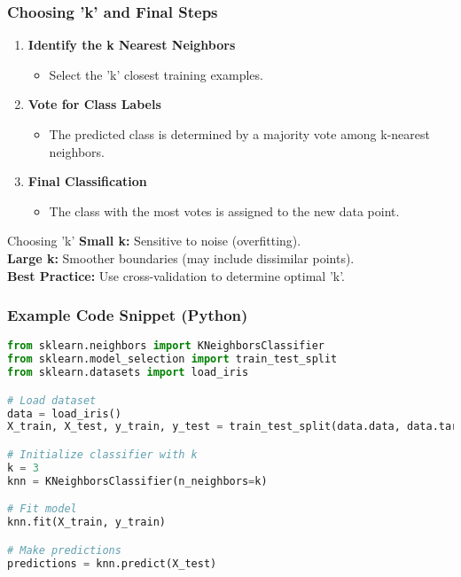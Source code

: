 \documentclass[aspectratio=169]{beamer}
\begin{document}
\begin{frame}
    \frametitle{Choosing 'k' and Final Steps}
    \begin{enumerate}[resume]
        \item \textbf{Identify the k Nearest Neighbors}
              \begin{itemize}
                  \item Select the 'k' closest training examples.
              \end{itemize}
        \item \textbf{Vote for Class Labels}
              \begin{itemize}
                  \item The predicted class is determined by a majority vote among k-nearest neighbors.
              \end{itemize}
        \item \textbf{Final Classification}
              \begin{itemize}
                  \item The class with the most votes is assigned to the new data point.
              \end{itemize}
    \end{enumerate}
    
    \begin{block}{Choosing 'k'}
        \textbf{Small k:} Sensitive to noise (overfitting).\\
        \textbf{Large k:} Smoother boundaries (may include dissimilar points).\\
        \textbf{Best Practice:} Use cross-validation to determine optimal 'k'.
    \end{block}
\end{frame}

\begin{frame}[fragile]
    \frametitle{Example Code Snippet (Python)}
    \begin{lstlisting}[language=Python]
from sklearn.neighbors import KNeighborsClassifier
from sklearn.model_selection import train_test_split
from sklearn.datasets import load_iris

# Load dataset
data = load_iris()
X_train, X_test, y_train, y_test = train_test_split(data.data, data.target, test_size=0.2)

# Initialize classifier with k
k = 3
knn = KNeighborsClassifier(n_neighbors=k)

# Fit model
knn.fit(X_train, y_train)

# Make predictions
predictions = knn.predict(X_test)
    \end{lstlisting}
\end{frame}
\end{document}
